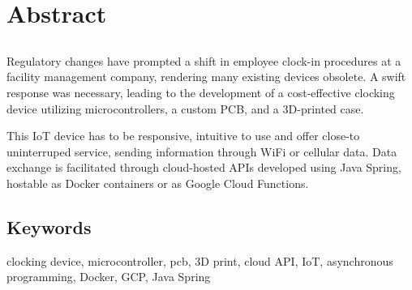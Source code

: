 \chapter*{Abstract}

\section*{\tituloPortadaEngVal}

Regulatory changes have prompted a shift in employee clock-in procedures at a facility management company, rendering many existing 
devices obsolete. A swift response was necessary, leading to the development of a cost-effective clocking device utilizing 
microcontrollers, a custom PCB, and a 3D-printed case.

This IoT device has to be responsive, intuitive to use and offer close-to uninterruped service, sending information through WiFi 
or cellular data. Data exchange is facilitated through cloud-hosted APIs developed using Java Spring, hostable as Docker containers
or as Google Cloud Functions.

\section*{Keywords}

\noindent clocking device, microcontroller, pcb, 3D print, cloud API, IoT, asynchronous programming, Docker, GCP, Java Spring




